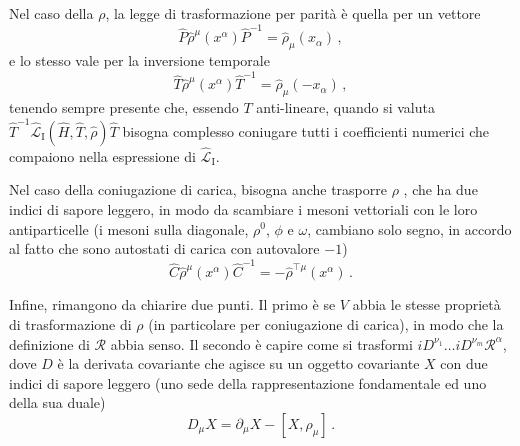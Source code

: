 \documentclass{article}
\begin{document}
Nel caso della $\rho$, la legge di trasformazione per parità è quella per un vettore
\begin{equation}
  \hat{P} \hat{\rho}^\mu(x^\alpha) \hat{P}^{-1} = \hat{\rho}_\mu(x_\alpha) \, , 
\end{equation}
e lo stesso vale per la inversione temporale
\begin{equation}
  \hat{T} \hat{\rho}^\mu(x^\alpha) \hat{T}^{-1} = \hat{\rho}_\mu(-x_\alpha) \, ,
\end{equation}
tenendo sempre presente che, essendo $T$ anti-lineare, quando si valuta $\hat{T}^{-1} \hat{\mathcal{L}}_\text{I}(\hat{H}, \hat{T}, \hat{\rho}) \hat{T}$ bisogna complesso coniugare tutti i coefficienti numerici che compaiono nella espressione di $\hat{\mathcal{L}}_\text{I}$.

Nel caso della coniugazione di carica, bisogna anche trasporre $\rho$ \cite{article:Tyutin}, che ha due indici di sapore leggero, in modo da scambiare i mesoni vettoriali con le loro antiparticelle (i mesoni sulla diagonale, $\rho^0$, $\phi$ e $\omega$, cambiano solo segno, in accordo al fatto che sono autostati di carica con autovalore $-1$)
\begin{equation}
  \hat{C} \hat{\rho}^\mu(x^\alpha) \hat{C}^{-1} = - \hat{\rho}^{\top \mu}(x^\alpha) \, .
\end{equation}

Infine, rimangono da chiarire due punti. Il primo è se $V$ abbia le stesse proprietà di trasformazione di $\rho$ (in particolare per coniugazione di carica), in modo che la definizione di $\mathcal{R}$ abbia senso. Il secondo è capire come si trasformi $i D^{\nu_1} \dots i D^{\nu_m} \mathcal{R}^\alpha$, dove $D$ è la derivata covariante che agisce su un oggetto covariante $X$ con due indici di sapore leggero (uno sede della rappresentazione fondamentale ed uno della sua duale)
\begin{equation}
  D_\mu X = \partial_\mu X - \left[X,\rho_\mu \right] \, .
  \label{eq:covariant_derivative}
\end{equation}
\end{document}
